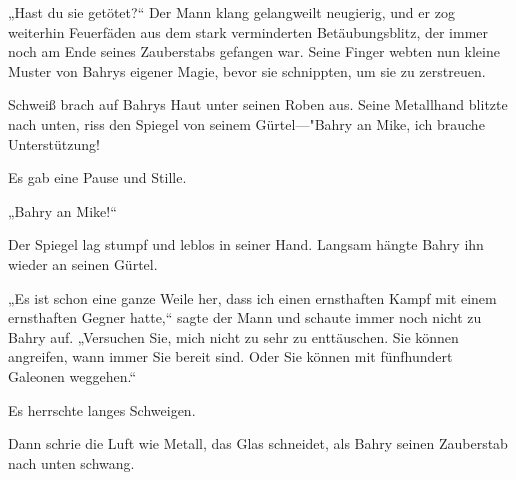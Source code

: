 „Hast du sie getötet?“ Der Mann klang gelangweilt neugierig, und er zog weiterhin Feuerfäden aus dem stark verminderten Betäubungsblitz, der immer noch am Ende seines Zauberstabs gefangen war. Seine Finger webten nun kleine Muster von Bahrys eigener Magie, bevor sie schnippten, um sie zu zerstreuen.

Schweiß brach auf Bahrys Haut unter seinen Roben aus. Seine Metallhand blitzte nach unten, riss den Spiegel von seinem Gürtel—"Bahry an Mike, ich brauche Unterstützung!

Es gab eine Pause und Stille.

„Bahry an Mike!“

Der Spiegel lag stumpf und leblos in seiner Hand. Langsam hängte Bahry ihn wieder an seinen Gürtel.

„Es ist schon eine ganze Weile her, dass ich einen ernsthaften Kampf mit einem ernsthaften Gegner hatte,“ sagte der Mann und schaute immer noch nicht zu Bahry auf. „Versuchen Sie, mich nicht zu sehr zu enttäuschen. Sie können angreifen, wann immer Sie bereit sind. Oder Sie können mit fünfhundert Galeonen weggehen.“

Es herrschte langes Schweigen.

Dann schrie die Luft wie Metall, das Glas schneidet, als Bahry seinen Zauberstab nach unten schwang.

\later

